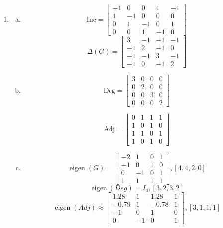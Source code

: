 \documentclass[12pt]{article}
\begin{document}
\begin{enumerate}[G1]
	\item 
		\begin{enumerate}[(a)]
			\item 
				\[\mathrm{Inc} = 
					\begin{bmatrix}
						-1 & 0 & 0 & 1 & -1\\
						1 & -1 & 0 & 0 & 0\\
						0 & 1 & -1 & 0 & 1\\
						0 & 0 & 1 & -1 & 0
					\end{bmatrix}
				\]
				\[\Delta(G) = 
					\begin{bmatrix}
						3 & -1 & -1 & -1\\
						-1 & 2 & -1 & 0\\
						-1 & -1 & 3 & -1\\
						-1 & 0 & -1 & 2
					\end{bmatrix}
				\]
				
			\item 
				\[\mathrm{Deg} = 
					\begin{bmatrix}
						3 & 0 & 0 & 0\\
						0 & 2 & 0 & 0\\
						0 & 0 & 3 & 0\\
						0 & 0 & 0 & 2
					\end{bmatrix}
				\]
				
				\[\mathrm{Adj} = 
					\begin{bmatrix}
						0 & 1 & 1 & 1\\
						1 & 0 & 1 & 0\\
						1 & 1 & 0 & 1\\
						1 & 0 & 1 & 0
					\end{bmatrix}
				\]
				
			\item 
				\[\operatorname{eigen}(G) = 
					\begin{bmatrix}
						-2 & 1 & 0 & 1\\
						-1 & 0 & 1 & 0\\
						0 & -1 & 0 & 1\\
						1 & 1 & 1 & 1
					\end{bmatrix}, [4,4,2,0]
				\]
				\[\operatorname{eigen}(Deg) = I_4, [3, 2 , 3, 2]
				\]
				\[
				\operatorname{eigen}(Adj) \approx
					\begin{bmatrix}
						1.28 & 1 & 1.28 & 1\\
						-0.79 & 1 & -0.78 & 1\\
						-1 & 0 & 1 & 0\\
						0 & -1 & 0 & 1
					\end{bmatrix}, [3,1,1,1]
				\]
		\end{enumerate}
\end{enumerate}
\newpage
\end{document}
